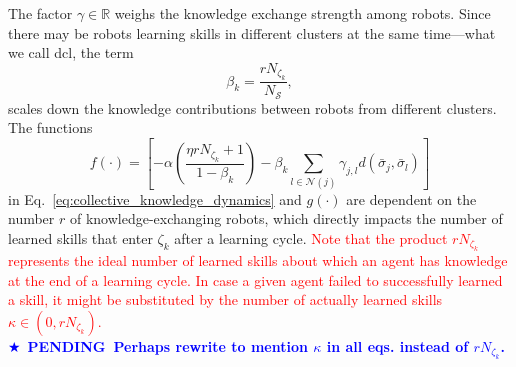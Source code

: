 \documentclass[12pt]{article}
\newcommand\myhl[1]{\textcolor{red}{#1}}
\newcommand*{\pending}[1]{\textcolor{blue}{$\bigstar$~\textbf{PENDING~#1}}}
\begin{document}
The factor $\gamma \in \mathbb{R} $ weighs the knowledge exchange strength among robots. Since there may be robots learning skills in different clusters at the same time---what we call \ac{dcl}, the term
\begin{equation}
	\beta_{k} = \frac{ rN_{\zeta_k}}{N_\mathcal{S}}, 
\end{equation}
scales down the knowledge contributions between robots from different clusters. The functions
\begin{equation}\label{eq:f_function_collective}
	f(\cdot) = \left[-\alpha \left( \frac{\eta r N_{\zeta_k} + 1}{1 - \beta_k} \right)  - \beta_k \sum_{l \in \mathcal{N}(j)}\gamma_{j,l}d(\bar{\sigma}_j,\bar{\sigma}_l)\right]
\end{equation}
\noindent in Eq.~\eqref{eq:collective_knowledge_dynamics} and $g(\cdot)$ are dependent on the number $r$ of knowledge-exchanging robots, which directly impacts the number of learned skills that enter $\zeta_k$ after a learning cycle. \myhl{Note that the product $r N_{\zeta_k}$ represents the ideal number of learned skills about which an agent has knowledge at the end of a learning cycle. In case a given agent failed to successfully learned a skill, it might be substituted by the number of actually learned skills $\kappa \in (0, r N_{\zeta_k})$.}\\
\pending{Perhaps rewrite to mention $\kappa$ in all eqs. instead of $r N_{\zeta_k}$.}
\end{document}
